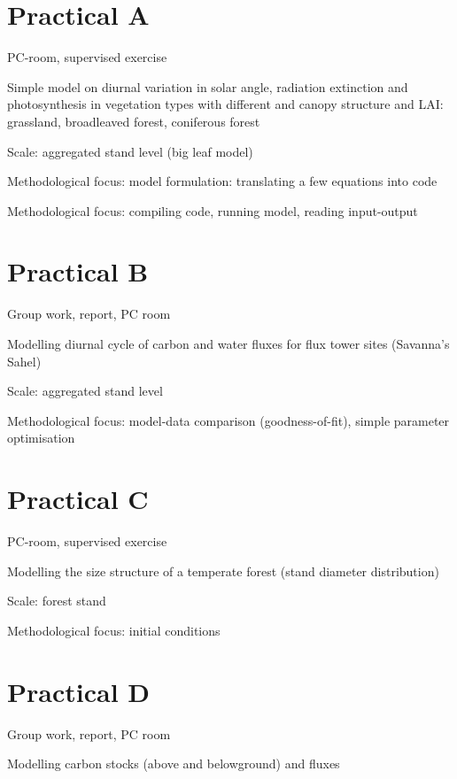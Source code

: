 \documentclass[12pt,oneside]{book}
\begin{document}
\chapter*{Practical A}\label{practical-a}

PC-room, supervised exercise

Simple model on diurnal variation in solar angle, radiation extinction
and photosynthesis in vegetation types with different and canopy
structure and LAI: grassland, broadleaved forest, coniferous forest

Scale: aggregated stand level (big leaf model)

Methodological focus: model formulation: translating a few equations
into code

Methodological focus: compiling code, running model, reading
input-output

\chapter*{Practical B}\label{practical-b}

Group work, report, PC room

Modelling diurnal cycle of carbon and water fluxes for flux tower sites
(Savanna's Sahel)

Scale: aggregated stand level

Methodological focus: model-data comparison (goodness-of-fit), simple
parameter optimisation

\chapter*{Practical C}\label{practical-c}

PC-room, supervised exercise

Modelling the size structure of a temperate forest (stand diameter
distribution)

Scale: forest stand

Methodological focus: initial conditions

\chapter*{Practical D}\label{practical-d}

Group work, report, PC room

Modelling carbon stocks (above and belowground) and fluxes
\end{document}
